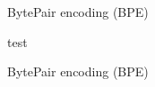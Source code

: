 
\begin{vbframe}{BytePair encoding (BPE)}

test

\end{vbframe}


\begin{vbframe}{BytePair encoding (BPE)}


\end{vbframe}


\endlecture

